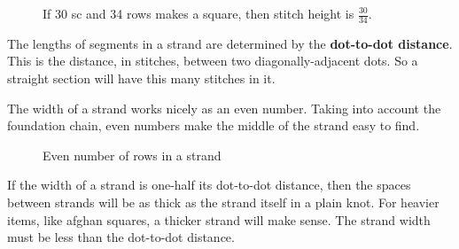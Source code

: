 \documentclass[openany]{book}
\begin{document}
\begin{figure}[H]\centering
{}
\caption{If 30 sc and 34 rows makes a square, then stitch height is $\frac{30}{34}$.}
\end{figure}


The lengths of segments in a strand are determined by the \textbf{dot-to-dot distance}. This is the distance, in stitches, between two diagonally-adjacent dots. So a straight section will have this many stitches in it.

The width of a strand works nicely as an even number. Taking into account the foundation chain, even numbers make the middle of the strand easy to find.

\begin{figure}[H]\centering
{}
\caption{Even number of rows in a strand}
\end{figure}

If the width of a strand is one-half its dot-to-dot distance, then the spaces between strands will be as thick as the strand itself in a plain knot. For heavier items, like afghan squares, a thicker strand will make sense. The strand width must be less than the dot-to-dot distance.
\end{document}
